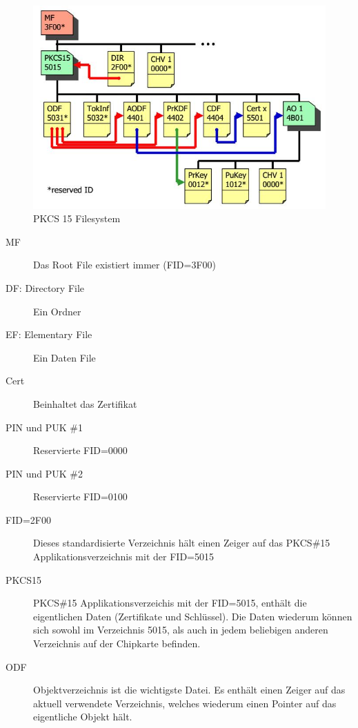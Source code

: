 \begin{figure}[h!]
	\centering
	\includegraphics[width=0.7\linewidth]{images/pkcs15}
	\caption{PKCS 15 Filesystem}
	\label{fig:pkcs15}
\end{figure}

\begin{description}
	\item[MF] Das Root File existiert immer (FID=3F00)
	\item[DF: Directory File] Ein Ordner
	\item[EF: Elementary File] Ein Daten File
	\item[Cert] Beinhaltet das Zertifikat
	\item[PIN und PUK \#1] Reservierte FID=0000
	\item[PIN und PUK \#2] Reservierte FID=0100
	\item[FID=2F00] Dieses standardisierte Verzeichnis hält einen Zeiger auf das PKCS\#15 Applikationsverzeichnis mit der FID=5015
	\item[PKCS15] PKCS\#15 Applikationsverzeichis mit der FID=5015, enthält die eigentlichen Daten (Zertifikate und Schlüssel). Die Daten wiederum können sich sowohl im Verzeichnis 5015, als auch in jedem beliebigen anderen Verzeichnis auf der Chipkarte befinden.
	\item[ODF] Objektverzeichnis ist die wichtigste Datei. Es enthält einen Zeiger auf das aktuell verwendete Verzeichnis, welches wiederum einen Pointer auf das eigentliche Objekt hält.
\end{description}


